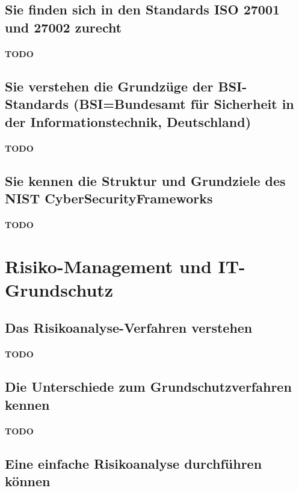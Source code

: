 \documentclass[10pt,a4paper]{article}
\begin{document}
\subsection*{Sie finden sich in den Standards ISO 27001 und 27002 zurecht}
\paragraph*{TODO}

\subsection*{Sie verstehen die Grundzüge der BSI-Standards (BSI=Bundesamt für Sicherheit in der Informationstechnik, Deutschland)}
\paragraph*{TODO}

\subsection*{Sie kennen die Struktur und Grundziele des NIST CyberSecurityFrameworks}
\paragraph*{TODO}


\section{Risiko-Management und IT-Grundschutz}
\subsection*{Das Risikoanalyse-Verfahren verstehen}
\paragraph*{TODO}

\subsection*{Die Unterschiede zum Grundschutzverfahren kennen}
\paragraph*{TODO}

\subsection*{Eine einfache Risikoanalyse durchführen können}
\end{document}
